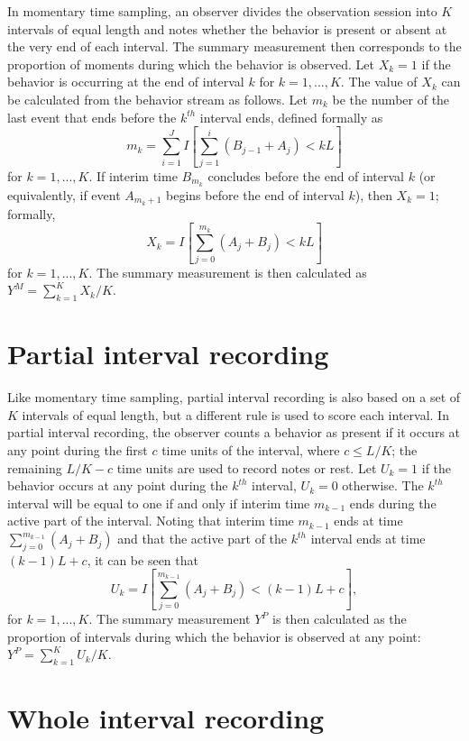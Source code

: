 \documentclass{article}\usepackage[]{graphicx}\usepackage[]{color}
\begin{document}
In momentary time sampling, an observer divides the observation session into $K$ intervals of equal length and notes whether the behavior is present or absent at the very end of each interval. The summary measurement then corresponds to the proportion of moments during which the behavior is observed. Let $X_k = 1$ if the behavior is occurring at the end of interval $k$ for $k = 1,...,K$. The value of $X_k$ can be calculated from the behavior stream as follows. 
Let $m_k$ be the number of the last event that ends before the $k^{th}$ interval ends, defined formally as \[
m_k = \sum_{i=1}^J I\left[\sum_{j=1}^i \left(B_{j-1} + A_j\right) < k L \right] \]
for $k = 1,...,K$. If interim time $B_{m_k}$ concludes before the end of interval $k$ (or equivalently, if event $A_{m_k+1}$ begins before the end of interval $k$), then $X_k = 1$; formally,  \[
X_k = I\left[\sum_{j=0}^{m_k} \left(A_j + B_j\right) < k L \right] \]
for $k = 1,...,K$. The summary measurement is then calculated as $\displaystyle{Y^M = \sum_{k=1}^K X_k / K}$. 

\section{Partial interval recording}

Like momentary time sampling, partial interval recording is also based on a set of $K$ intervals of equal length, but a different rule is used to score each interval. In partial interval recording, the observer counts a behavior as present if it occurs at any point during the first $c$ time units of the interval, where $c \leq L / K$; the remaining $L / K - c$ time units are used to record notes or rest. Let $U_k = 1$ if the behavior occurs at any point during the $k^{th}$ interval, $U_k = 0$ otherwise. The $k^{th}$ interval will be equal to one if and only if interim time $m_{k-1}$ ends during the active part of the interval. Noting that interim time $m_{k-1}$ ends at time $\sum_{j=0}^{m_{k-1}} \left(A_j + B_j\right)$ and that the active part of the $k^{th}$ interval ends at time $(k-1)L + c$, it can be seen that\[
U_k = I \left[\sum_{j=0}^{m_{k-1}} \left(A_j + B_j\right) < (k-1)L + c \right], \]
for $k=1,...,K$. The summary measurement $Y^P$ is then calculated as the proportion of intervals during which the behavior is observed at any point: $\displaystyle{Y^P = \sum_{k=1}^K U_k / K}$.

\section{Whole interval recording}
\end{document}

